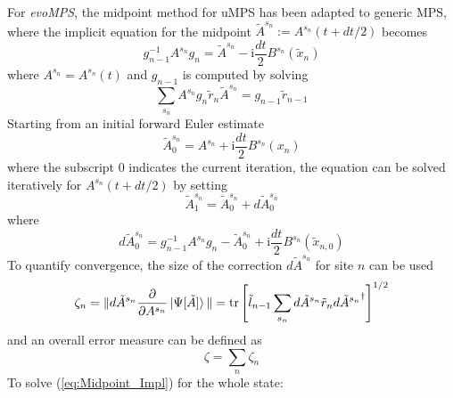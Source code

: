 \documentclass[a4paper,11pt]{article}
\begin{document}
For \emph{evoMPS}, the midpoint method for uMPS has been adapted to generic MPS, 
where the implicit equation
for the midpoint $\tilde{A}^{s_n} := A^{s_n}(t + dt/2)$ becomes
\begin{equation}
    g_{n-1}^{-1} A^{s_n} g_n = \tilde{A}^{s_n} - \mathrm{i} \frac{dt}{2} B^{s_n}(\tilde{x}_n)
    \label{eq:Midpoint_Impl}
\end{equation}
where $A^{s_n} = A^{s_n}(t)$ and $g_{n-1}$ is computed by solving
\begin{equation}
	\sum_{s_n} A^{s_n} g_n \tilde{r}_n \tilde{A}^{s_n} = g_{n-1} \tilde{r}_{n-1}
    \label{eq:Midpoint_GT}	
\end{equation}
Starting from an initial forward Euler estimate 
\begin{equation}
	\tilde{A}^{s_n}_0 = A^{s_n} + \mathrm{i} \frac{dt}{2} B^{s_n}(x_{n})
	\label{eq:Midpoint_Init_Step}
\end{equation}
where the subscript $0$ indicates the current iteration,
the equation can be solved iteratively for $A^{s_n}(t + dt/2)$ by setting
\begin{equation}
	\tilde{A}^{s_n}_1 = \tilde{A}^{s_n}_0 + d\tilde{A}^{s_n}_0
	\label{eq:Midpoint_ItrNext}
\end{equation}
where
\begin{equation}
	d\tilde{A}^{s_n}_0 = g_{n-1}^{-1} A^{s_n} g_n - \tilde{A}^{s_n}_0 + \mathrm{i} \frac{dt}{2} B^{s_n}(\tilde{x}_{n, 0})
	\label{eq:Midpoint_dA}
\end{equation}
To quantify convergence, the size of the correction $d\tilde{A}^{s_n}$ for site $n$ can be used
\begin{equation}
	\zeta_n = \| d\tilde{A}^{s_n}\frac{\partial}{\partial A^{s_n}} \ket{\Psi[\tilde{A}]} \|= \mathrm{tr} \left[ \tilde{l}_{n-1} \sum_{s_n} d\tilde{A}^{s_n} \tilde{r}_n {d\tilde{A}^{s_n}}^\dagger \right]^{1/2}
	\label{eq:Midpoint_Err}
\end{equation}
and an overall error measure can be defined as
\begin{equation}
	\zeta = \sum_n \zeta_n
	\label{eq:Midpoint_Err_All}
\end{equation}
To solve (\ref{eq:Midpoint_Impl}) for the whole state:
\end{document}
